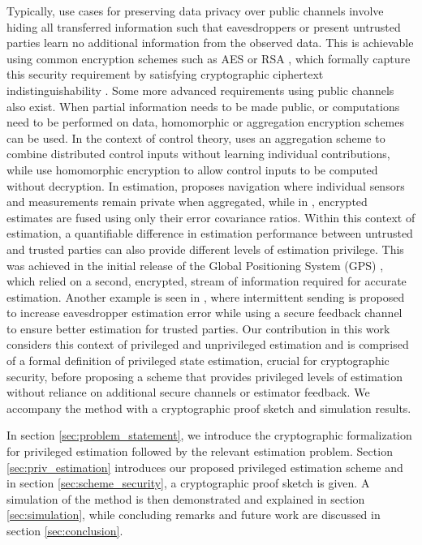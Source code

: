 \documentclass[letterpaper, 10 pt, conference]{ieeeconf}
\begin{document}
Typically, use cases for preserving data privacy over public channels involve hiding all transferred information such that eavesdroppers or present untrusted parties learn no additional information from the observed data. This is achievable using common encryption schemes such as AES \cite{gueronIntelAdvancedEncryption2010} or RSA \cite{rivestMethodObtainingDigital1978}, which formally capture this security requirement by satisfying cryptographic ciphertext indistinguishability \cite[Ch. 3]{katzIntroductionModernCryptography2008}. Some more advanced requirements using public channels also exist. When partial information needs to be made public, or computations need to be performed on data, homomorphic or aggregation encryption schemes can be used. In the context of control theory, \cite{alexandruPrivateWeightedSum2020} uses an aggregation scheme to combine distributed control inputs without learning individual contributions, while \cite{alexandruEncryptedCooperativeControl2019,farokhiSecurePrivateControl2017} use homomorphic encryption to allow control inputs to be computed without decryption. In estimation, \cite{risticPrivacyPreservingLocalizationUsing} proposes navigation where individual sensors and measurements remain private when aggregated, while in \cite{risticSecureFastCovariance2020}, encrypted estimates are fused using only their error covariance ratios. Within this context of estimation, a quantifiable difference in estimation performance between untrusted and trusted parties can also provide different levels of estimation privilege. This was achieved in the initial release of the Global Positioning System (GPS) \cite{grovesPrinciplesGNSSInertial2015}, which relied on a second, encrypted, stream of information required for accurate estimation. Another example is seen in \cite{leongTransmissionSchedulingRemote2019}, where intermittent sending is proposed to increase eavesdropper estimation error while using a secure feedback channel to ensure better estimation for trusted parties. Our contribution in this work considers this context of privileged and unprivileged estimation and is comprised of a formal definition of privileged state estimation, crucial for cryptographic security, before proposing a scheme that provides privileged levels of estimation without reliance on additional secure channels or estimator feedback. We accompany the method with a cryptographic proof sketch and simulation results.

In section \ref{sec:problem_statement}, we introduce the cryptographic formalization for privileged estimation followed by the relevant estimation problem. Section \ref{sec:priv_estimation} introduces our proposed privileged estimation scheme and in section \ref{sec:scheme_security}, a cryptographic proof sketch is given. A simulation of the method is then demonstrated and explained in section \ref{sec:simulation}, while concluding remarks and future work are discussed in section \ref{sec:conclusion}.
\end{document}
